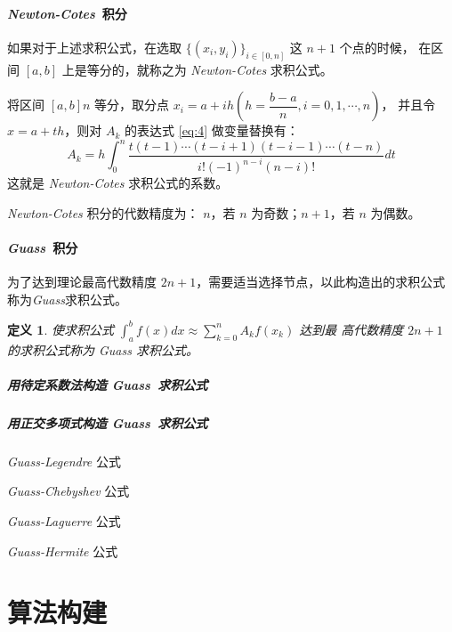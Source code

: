 \documentclass[UTF8, 11pt, a4paper]{ctexart}
\newtheorem*{defi}{定义}
\begin{document}
\begin{spacing}{1.5}
\subsection{\emph{Newton-Cotes}~积分}
如果对于上述求积公式，在选取 $ \{ (x_i,y_i) \}_{i\in[0,n]} $ 这 $ n+1 $ 个点的时候，
在区间 $ [a,b] $ 上是等分的，就称之为 \emph{Newton-Cotes} 求积公式。

将区间 $ [a,b] n $ 等分，取分点 $ x_i = a + ih ( h = \dfrac{ b-a }{ n },i=0,1,\cdots,n ) $，
并且令 $ x = a+th $，则对 $ A_k $ 的表达式 \eqref{eq:4} 做变量替换有：
\begin{equation}
A_k = h \int _0^n \dfrac{ t(t-1)\cdots(t-i+1)(t-i-1)\cdots(t-n) }{ i!(-1)^{n-i}(n-i)! } dt
\label{eq:5}
\end{equation}
这就是 \emph{Newton-Cotes} 求积公式的系数。

\emph{Newton-Cotes} 积分的代数精度为： $ n $，若 $ n $ 为奇数；$ n+1 $，若 $ n $ 为偶数。

\subsection{\emph{Guass}~积分}
为了达到理论最高代数精度 $ 2n+1 $，需要适当选择节点，以此构造出的求积公式称为\emph{Guass}求积公式。
\begin{defi}
使求积公式 $ \int_a^b f(x) dx \approx \sum \limits _{k=0}^{n} A_k f(x_k) $ 达到最
高代数精度 $ 2n+1 $ 的求积公式称为 \emph{Guass} 求积公式。
\end{defi}

\subsubsection{用待定系数法构造 \emph{Guass}~求积公式 }
\subsubsection{用正交多项式构造 \emph{Guass}~求积公式 }

\subparagraph{ \emph{Guass-Legendre} 公式}

\subparagraph{ \emph{Guass-Chebyshev} 公式}

\subparagraph{ \emph{Guass-Laguerre} 公式}

\subparagraph{ \emph{Guass-Hermite} 公式}


\part{算法构建}

\end{spacing}
\end{document}
